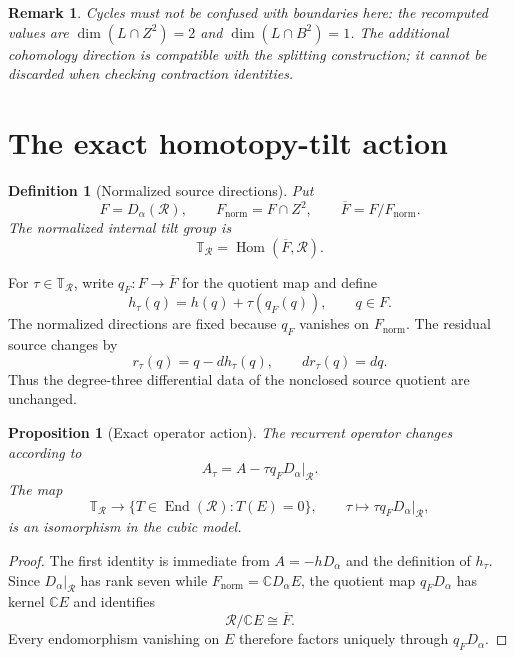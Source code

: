 \documentclass[11pt]{amsart}
\newtheorem{proposition}[theorem]{Proposition}
\newtheorem{definition}[theorem]{Definition}
\newtheorem{remark}[theorem]{Remark}
\newcommand{\C}{\mathbb C}
\newcommand{\End}{\operatorname{End}}
\newcommand{\Hom}{\operatorname{Hom}}
\begin{document}
\begin{remark}
Cycles must not be confused with boundaries here: the recomputed values are
\(\dim(L\cap Z^2)=2\) and \(\dim(L\cap B^2)=1\).
The additional cohomology direction is compatible with the splitting construction;
it cannot be discarded when checking contraction identities.
\end{remark}

\section{The exact homotopy-tilt action}

\begin{definition}[Normalized source directions]
Put
\[
F=D_\alpha(\mathcal R),
\qquad
F_{\mathrm{norm}}=F\cap Z^2,
\qquad
\overline F=F/F_{\mathrm{norm}}.
\]
The normalized internal tilt group is
\[
\mathbb T_{\mathcal R}=\Hom(\overline F,\mathcal R).
\]
\end{definition}

For \(\tau\in\mathbb T_{\mathcal R}\), write \(q_F:F\to\overline F\) for the quotient map and define
\[
h_\tau(q)=h(q)+\tau(q_F(q)),
\qquad q\in F.
\]
The normalized directions are fixed because \(q_F\) vanishes on \(F_{\mathrm{norm}}\).  The residual source changes by
\[
r_\tau(q)=q-dh_\tau(q),
\qquad
dr_\tau(q)=dq.
\]
Thus the degree-three differential data of the nonclosed source quotient are unchanged.

\begin{proposition}[Exact operator action]
The recurrent operator changes according to
\[
A_\tau=A-\tau q_FD_\alpha|_{\mathcal R}.
\]
The map
\[
\mathbb T_{\mathcal R}
\longrightarrow
\{T\in\End(\mathcal R):T(E)=0\},
\qquad
\tau\longmapsto \tau q_FD_\alpha|_{\mathcal R},
\]
is an isomorphism in the cubic model.
\end{proposition}

\begin{proof}
The first identity is immediate from \(A=-hD_\alpha\) and the definition of \(h_\tau\).  Since \(D_\alpha|_{\mathcal R}\) has rank seven while \(F_{\mathrm{norm}}=\C D_\alpha E\), the quotient map \(q_FD_\alpha\) has kernel \(\C E\) and identifies
\[
\mathcal R/\C E\cong\overline F.
\]
Every endomorphism vanishing on \(E\) therefore factors uniquely through \(q_FD_\alpha\).
\end{proof}
\end{document}
